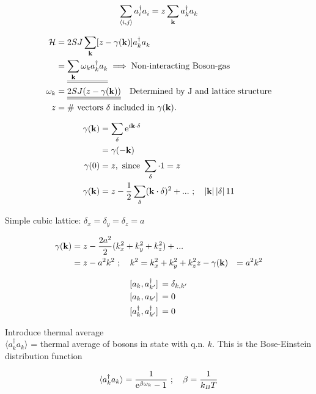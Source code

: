 \begin{equation}
	\sum_{\langle i, j \rangle} a_i^\dagger a_i^{} = z\sum_{\vb{k}}a_k^\dagger a_k^{}
\end{equation}

\begin{align}
	\Ha &= 2SJ\sum_{\vb{k}}[z-\gamma(\vb{k})]a_k^\dagger a_k^{} \\
	&= \uline{\uline{\sum_{\vb{k}}\omega_k a_k^\dagger a_k^{}}} \implies \text{Non-interacting Boson-gas}\\
	\omega_k &= \uline{\uline{2SJ(z-\gamma(\vb{k}))}} \quad \text{Determined by J and lattice structure} \\
	z &= \# \text{ vectors } \vb{\delta} \text{ included in } \gamma(\vb{k}).
\end{align}

\begin{align}
	\gamma(\vb{k}) &= \sum_{\vb{\delta}}\mathrm{e}^{i\vb{k}\cdot\vb{\delta}} \\
	&= \gamma(-\vb{k}) \\
	\gamma(0) &= z, \text{ since } \sum_{\vb{\delta}}\cdot 1 = z \\
	\gamma(\vb{k}) &= z - \frac{1}{2}\sum_{\vb{\delta}}(\vb{k}\cdot\vb{\delta})^2 + ... \ ; \quad \abs*{\vb{k}}\abs*{\vb{\delta}} 1 1
\end{align}

Simple cubic lattice: \quad $\delta_x = \delta_y = \delta_z = a$

\begin{align}
	\gamma(\vb{k}) &= z - \frac{2a^2}{2}(k_x^2 + k_y^2 + k_z^2) + ... \\
	&= z - a^2 k^2 \ ; \quad k^2 = k_x^2 + k_y^2 + k_z^2
	z - \gamma(\vb{k}) &= a^2 k^2
\end{align}

\begin{align}
	\comm*{a_k}{a_{k'}^\dagger} &= \delta_{k, k'} \\
	\comm*{a_k}{a_{k'}} &= 0 \\
	\comm*{a_k^\dagger}{a_{k'}^\dagger} &= 0
\end{align}

Introduce thermal average \\ 
$\langle a_k^\dagger a_k \rangle$ = thermal average of bosons in state with q.n. $k$. This is the Bose-Einstein distribution function

\begin{equation}
	\langle a_k^\dagger a_k \rangle = \frac{1}{\mathrm{e}^{\beta \omega_k} - 1} \ ; \quad \beta = \frac{1}{k_B T}
\end{equation}

